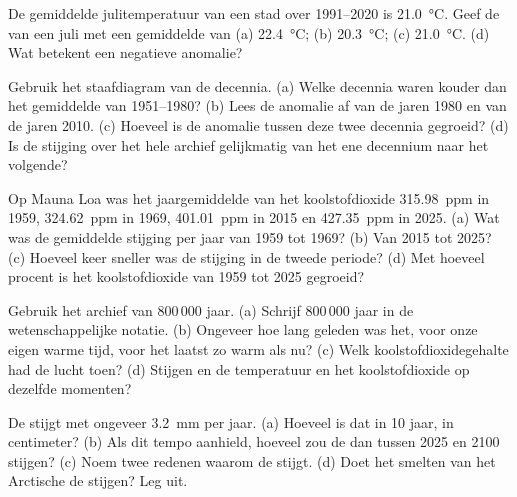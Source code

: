 \begin{exercise}[$\star$]\label{exo:g9:climate-past-and-present:4}
De gemiddelde julitemperatuur van een stad over 1991--2020 is
\qty{21.0}{\degreeCelsius}. Geef de  van een juli met
een gemiddelde van (a) \qty{22.4}{\degreeCelsius};
(b) \qty{20.3}{\degreeCelsius}; (c) \qty{21.0}{\degreeCelsius}. (d) Wat
betekent een negatieve anomalie?
\end{exercise}

\begin{exercise}[$\star\star$]\label{exo:g9:climate-past-and-present:5}
Gebruik het staafdiagram van de decennia. (a) Welke decennia waren kouder
dan het gemiddelde van 1951--1980? (b) Lees de anomalie af van de jaren
1980 en van de jaren 2010. (c) Hoeveel is de anomalie tussen deze twee
decennia gegroeid? (d) Is de stijging over het hele archief gelijkmatig
van het ene decennium naar het volgende?
\end{exercise}

\begin{exercise}[$\star\star$]\label{exo:g9:climate-past-and-present:6}
Op Mauna Loa was het jaargemiddelde van het koolstofdioxide
\qty{315.98}{ppm} in 1959, \qty{324.62}{ppm} in 1969, \qty{401.01}{ppm}
in 2015 en \qty{427.35}{ppm} in 2025. (a) Wat was de gemiddelde stijging
per jaar van 1959 tot 1969? (b) Van 2015 tot 2025? (c) Hoeveel keer
sneller was de stijging in de tweede periode? (d) Met hoeveel procent is
het koolstofdioxide van 1959 tot 2025 gegroeid?
\end{exercise}

\begin{exercise}[$\star\star$]\label{exo:g9:climate-past-and-present:7}
Gebruik het archief van 800\,000 jaar. (a) Schrijf 800\,000 jaar in de
wetenschappelijke notatie. (b) Ongeveer hoe lang geleden was het, voor
onze eigen warme tijd, voor het laatst zo warm als nu? (c) Welk
koolstofdioxidegehalte had de lucht toen? (d) Stijgen en  de
temperatuur en het koolstofdioxide op dezelfde momenten?
\end{exercise}

\begin{exercise}[$\star\star$]\label{exo:g9:climate-past-and-present:8}
De  stijgt met ongeveer \qty{3.2}{mm} per jaar. (a) Hoeveel is dat in
10 jaar, in centimeter? (b) Als dit tempo aanhield, hoeveel zou de  dan
tussen 2025 en 2100 stijgen? (c) Noem twee redenen waarom de  stijgt.
(d) Doet het smelten van het Arctische  de  stijgen? Leg uit.
\end{exercise}

